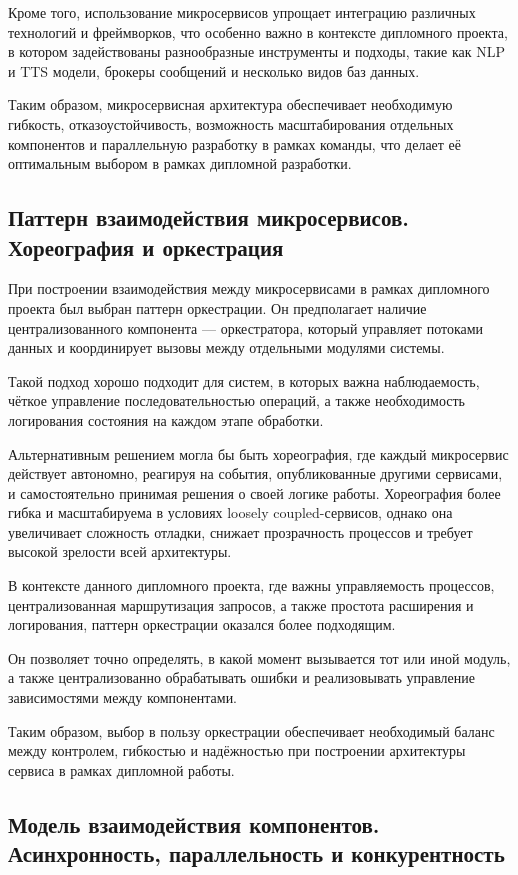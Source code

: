 Кроме того, использование микросервисов упрощает
интеграцию различных технологий и фреймворков,
что особенно важно в контексте дипломного проекта,
в котором задействованы разнообразные инструменты и подходы,
такие как NLP и TTS модели,
брокеры сообщений и несколько видов баз данных.

Таким образом, микросервисная архитектура обеспечивает
необходимую гибкость, отказоустойчивость,
возможность масштабирования отдельных компонентов
и параллельную разработку в рамках команды,
что делает её оптимальным выбором в рамках дипломной разработки.

\subsection{Паттерн взаимодействия микросервисов. Хореография и оркестрация}

При построении взаимодействия между микросервисами
в рамках дипломного проекта был выбран паттерн оркестрации.
Он предполагает наличие централизованного компонента — оркестратора,
который управляет потоками данных и координирует вызовы
между отдельными модулями системы.

Такой подход хорошо подходит для систем,
в которых важна наблюдаемость,
чёткое управление последовательностью операций,
а также необходимость логирования состояния на каждом этапе обработки.

Альтернативным решением могла бы быть хореография,
где каждый микросервис действует автономно,
реагируя на события, опубликованные другими сервисами,
и самостоятельно принимая решения о своей логике работы.
Хореография более гибка и масштабируема
в условиях loosely coupled-сервисов,
однако она увеличивает сложность отладки,
снижает прозрачность процессов
и требует высокой зрелости всей архитектуры.

В контексте данного дипломного проекта,
где важны управляемость процессов,
централизованная маршрутизация запросов,
а также простота расширения и логирования,
паттерн оркестрации оказался более подходящим.

Он позволяет точно определять,
в какой момент вызывается тот или иной модуль,
а также централизованно обрабатывать ошибки
и реализовывать управление зависимостями между компонентами.

Таким образом, выбор в пользу оркестрации
обеспечивает необходимый баланс между контролем,
гибкостью и надёжностью при построении архитектуры сервиса
в рамках дипломной работы.

\subsection{Модель взаимодействия компонентов. Асинхронность, параллельность и конкурентность}

